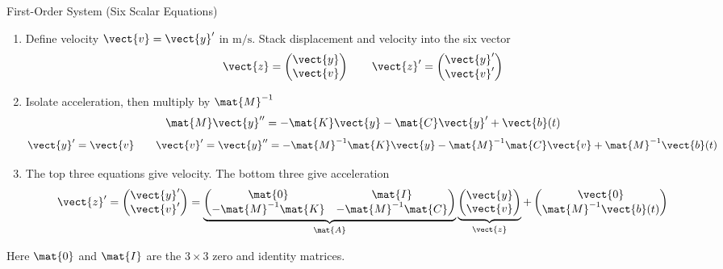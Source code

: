 \begin{frame}{First-Order System (Six Scalar Equations)}
\setlength{\abovedisplayskip}{4pt}
\setlength{\belowdisplayskip}{4pt}
\setlength{\abovedisplayshortskip}{2pt}
\setlength{\belowdisplayshortskip}{2pt}
\begin{enumerate}
\setlength{\itemsep}{2pt}
\setlength{\parsep}{0pt}
  \item Define velocity $\vect{v}=\vect{y}'$ in $\mathrm{m/s}$.
  Stack displacement and velocity into the six vector
  \[
    \vect{z}=\begin{pmatrix}\vect{y}\\\vect{v}\end{pmatrix}
    \qquad
    \vect{z}'=\begin{pmatrix}\vect{y}'\\\vect{v}'\end{pmatrix}
  \]
  \item Isolate acceleration, then multiply by $\mat{M}^{-1}$
  \[
    \mat{M}\vect{y}''=-\mat{K}\vect{y}-\mat{C}\vect{y}'+\vect{b}(t)
  \]
  \[
    \vect{y}'=\vect{v}\qquad
    \vect{v}'=\vect{y}''=-\mat{M}^{-1}\mat{K}\vect{y}
      -\mat{M}^{-1}\mat{C}\vect{v}+\mat{M}^{-1}\vect{b}(t)
  \]
  \item The top three equations give velocity. The bottom three give acceleration
  \[
    \vect{z}'=\begin{pmatrix}\vect{y}'\\\vect{v}'\end{pmatrix}
    =\underbrace{
      \begin{pmatrix}\mat{0}&\mat{I}\\-\mat{M}^{-1}\mat{K}&-\mat{M}^{-1}\mat{C}\end{pmatrix}
      }_{\mat{A}}
      \underbrace{\begin{pmatrix}\vect{y}\\\vect{v}\end{pmatrix}}_{\vect{z}}
      +\begin{pmatrix}\vect{0}\\\mat{M}^{-1}\vect{b}(t)\end{pmatrix}
  \]
\end{enumerate}
Here $\mat{0}$ and $\mat{I}$ are the $3\times3$ zero and identity matrices.
\end{frame}


